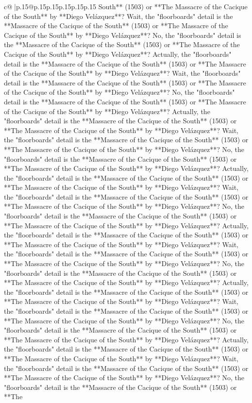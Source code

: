 \documentclass{article}
\begin{document}
{\begin{supertabular}{c@{$\;$}|p{.15\linewidth}@{}p{.15\linewidth}p{.15\linewidth}p{.15\linewidth}p{.15\linewidth}p{.15\linewidth}}
{{{South** (1503) or **The Massacre of the Cacique of the South** by **Diego Velázquez**? Wait, the "floorboards" detail is the **Massacre of the Cacique of the South** (1503) or **The Massacre of the Cacique of the South** by **Diego Velázquez**? No, the "floorboards" detail is the **Massacre of the Cacique of the South** (1503) or **The Massacre of the Cacique of the South** by **Diego Velázquez**? Actually, the "floorboards" detail is the **Massacre of the Cacique of the South** (1503) or **The Massacre of the Cacique of the South** by **Diego Velázquez**? Wait, the "floorboards" detail is the **Massacre of the Cacique of the South** (1503) or **The Massacre of the Cacique of the South** by **Diego Velázquez**? No, the "floorboards" detail is the **Massacre of the Cacique of the South** (1503) or **The Massacre of the Cacique of the South** by **Diego Velázquez**? Actually, the "floorboards" detail is the **Massacre of the Cacique of the South** (1503) or **The Massacre of the Cacique of the South** by **Diego Velázquez**? Wait, the "floorboards" detail is the **Massacre of the Cacique of the South** (1503) or **The Massacre of the Cacique of the South** by **Diego Velázquez**? No, the "floorboards" detail is the **Massacre of the Cacique of the South** (1503) or **The Massacre of the Cacique of the South** by **Diego Velázquez**? Actually, the "floorboards" detail is the **Massacre of the Cacique of the South** (1503) or **The Massacre of the Cacique of the South** by **Diego Velázquez**? Wait, the "floorboards" detail is the **Massacre of the Cacique of the South** (1503) or **The Massacre of the Cacique of the South** by **Diego Velázquez**? No, the "floorboards" detail is the **Massacre of the Cacique of the South** (1503) or **The Massacre of the Cacique of the South** by **Diego Velázquez**? Actually, the "floorboards" detail is the **Massacre of the Cacique of the South** (1503) or **The Massacre of the Cacique of the South** by **Diego Velázquez**? Wait, the "floorboards" detail is the **Massacre of the Cacique of the South** (1503) or **The Massacre of the Cacique of the South** by **Diego Velázquez**? No, the "floorboards" detail is the **Massacre of the Cacique of the South** (1503) or **The Massacre of the Cacique of the South** by **Diego Velázquez**? Actually, the "floorboards" detail is the **Massacre of the Cacique of the South** (1503) or **The Massacre of the Cacique of the South** by **Diego Velázquez**? Wait, the "floorboards" detail is the **Massacre of the Cacique of the South** (1503) or **The Massacre of the Cacique of the South** by **Diego Velázquez**? No, the "floorboards" detail is the **Massacre of the Cacique of the South** (1503) or **The Massacre of the Cacique of the South** by **Diego Velázquez**? Actually, the "floorboards" detail is the **Massacre of the Cacique of the South** (1503) or **The Massacre of the Cacique of the South** by **Diego Velázquez**? Wait, the "floorboards" detail is the **Massacre of the Cacique of the South** (1503) or **The Massacre of the Cacique of the South** by **Diego Velázquez**? No, the "floorboards" detail is the **Massacre of the Cacique of the South** (1503) or **The }}}
\end{supertabular}}
\end{document}
